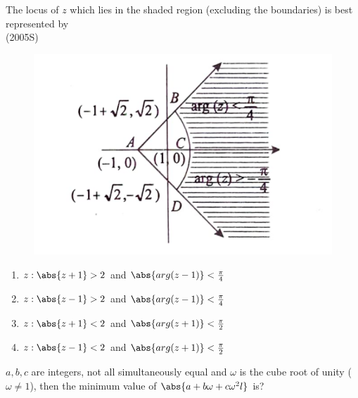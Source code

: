 	\item The locus of $z$ which lies in the shaded region (excluding the boundaries) is best represented by
\\

\hfill{(2005S)}\\
		
	        \begin{figure}[ht]
\includegraphics[scale=0.2]{JEE/Complex-Numbers/mcq-single/21-32/Figure/fig.png}
		\end{figure}
	
\begin{enumerate}
\item $z:\abs{z+1}>2$ and  $\abs{arg(z-1)}<\frac{\pi}{4}$
\item $z:\abs{z-1}>2$ and $\abs{arg(z-1)}<\frac{\pi}{4}$
\item $z:\abs{z+1}<2$ and $\abs{arg(z+1)}<\frac{\pi}{2}$
\item $z:\abs{z-1}<2$ and $\abs{arg(z+1)}<\frac{\pi}{2}$
\end{enumerate}

\item $a,b,c$ are integers, not all simultaneously equal and $\omega$ is the cube root of unity ($\omega \neq 1$), then the minimum value of $\abs{a+b\omega+c\omega^{2}l}$ is?         \\

